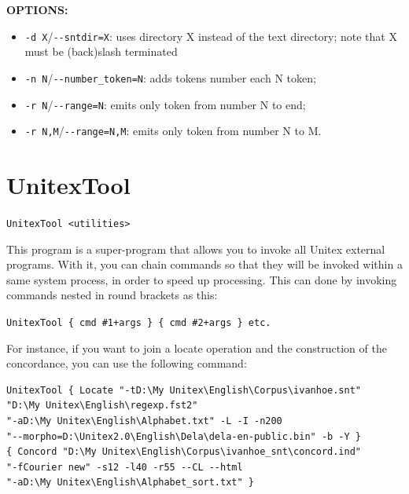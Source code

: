\bigskip
\noindent \textbf{OPTIONS:}
\begin{itemize}

  \item \verb+-d X+/\verb+--sntdir=X+: uses directory X instead of the text directory; note that X must be (back)slash terminated
  \item \verb+-n N+/\verb+--number_token=N+: adds tokens number each N token;
  \item \verb+-r N+/\verb+--range=N+: emits only token from number N to end;
  \item \verb+-r N,M+/\verb+--range=N,M+: emits only token from number N to M.
\end{itemize}








\section{UnitexTool}
\label{section-UnitexTool}
\verb+UnitexTool <utilities>+

\bigskip
\noindent This program is a super-program that allows you to invoke all Unitex
external programs. With it, you can chain commands so that they will be invoked
within a same system process, in order to speed up processing. This can done by
invoking commands nested in round brackets as this:

\bigskip
\noindent \verb$UnitexTool { cmd #1+args } { cmd #2+args } etc.$

\bigskip
\noindent For instance, if you want to join a locate operation and the
construction of the concordance, you can use the following command:

\bigskip
\begin{verbatim}
UnitexTool { Locate "-tD:\My Unitex\English\Corpus\ivanhoe.snt" 
"D:\My Unitex\English\regexp.fst2"
"-aD:\My Unitex\English\Alphabet.txt" -L -I -n200 
"--morpho=D:\Unitex2.0\English\Dela\dela-en-public.bin" -b -Y }
{ Concord "D:\My Unitex\English\Corpus\ivanhoe_snt\concord.ind" 
"-fCourier new" -s12 -l40 -r55 --CL --html 
"-aD:\My Unitex\English\Alphabet_sort.txt" }
\end{verbatim}









